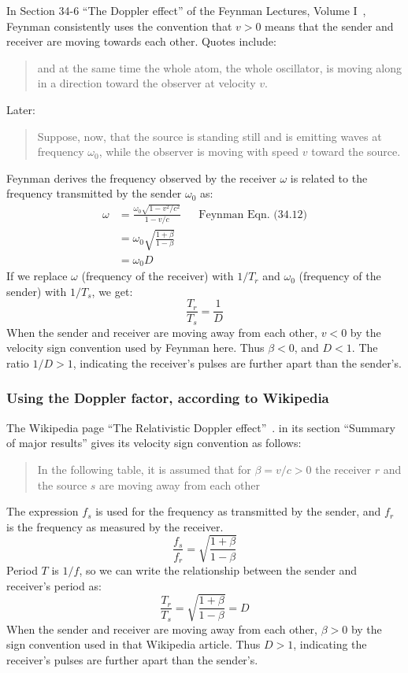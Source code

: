 \documentclass[a4paper]{article}
\theoremstyle{plain}
\theoremstyle{definition}
\begin{document}
In Section 34-6 ``The Doppler effect'' of the Feynman Lectures, Volume
I~\cite{FeynmanLecturesVolICh34Sec6}, Feynman consistently uses the
convention that $v > 0$ means that the sender and receiver are moving
towards each other.  Quotes include:
\begin{quote}
and at the same time the whole atom, the whole oscillator, is moving
along in a direction toward the observer at velocity $v$.
\end{quote}
Later:
\begin{quote}
Suppose, now, that the source is standing still and is emitting waves
at frequency $\omega_0$, while the observer is moving with speed $v$
toward the source.
\end{quote}
Feynman derives the frequency observed by the receiver $\omega$ is
related to the frequency transmitted by the sender $\omega_0$ as:
\begin{align*}
\omega
  & = \frac{\omega_0 \sqrt{1-v^2/c^2}}{1-v/c} & & \text{Feynman Eqn. (34.12)} \\
  & = \omega_0 \sqrt{ \frac{1+\beta}{1-\beta} } \\
  & = \omega_0 D
\end{align*}
If we replace $\omega$ (frequency of the receiver) with $1/T_r$ and
$\omega_0$ (frequency of the sender) with $1/T_s$, we get:
\begin{equation}
\frac{T_r}{T_s} = \frac{1}{D}
\end{equation}
When the sender and receiver are moving away from each other, $v < 0$
by the velocity sign convention used by Feynman here.  Thus
$\beta < 0$, and $D < 1$.  The ratio $1/D > 1$, indicating the
receiver's pulses are further apart than the sender's.


\subsubsection{Using the Doppler factor, according to Wikipedia}
\label{sec:DopplerFactorSignRulesWikipedia}

The Wikipedia page ``The Relativistic Doppler
effect''~\cite{WikipediaRelativisticDopplerEffect}.
in its section ``Summary of major results''
gives its velocity sign convention as follows:
\begin{quote}
In the following table, it is assumed that for $\beta = v/c > 0$ the
receiver $r$ and the source $s$ are moving away from each other
\end{quote}

The expression $f_s$ is used for the frequency as transmitted by the
sender, and $f_r$ is the frequency as measured by the receiver.
\begin{equation}
\frac{f_s}{f_r} = \sqrt{ \frac{1+\beta}{1-\beta} }
\end{equation}
Period $T$ is $1/f$, so we can write the relationship between the
sender and receiver's period as:
\begin{equation}
\frac{T_r}{T_s} = \sqrt{ \frac{1+\beta}{1-\beta} } = D
\end{equation}
When the sender and receiver are moving away from each other,
$\beta > 0$ by the sign convention used in that Wikipedia article.
Thus $D > 1$, indicating the receiver's pulses are further apart than
the sender's.
\end{document}
